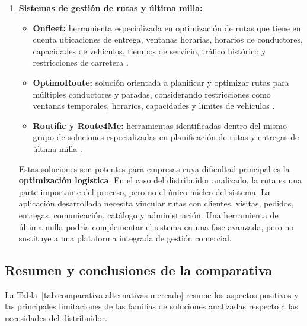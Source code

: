 \begin{enumerate}[label=\textbf{\arabic*.}, leftmargin=1.1cm, itemsep=0.6em, topsep=0.35em]
  \item \textbf{Sistemas de gestión de rutas y última milla:}
  \begin{itemize}[topsep=0.1em, itemsep=0.15em]
    \item \textbf{Onfleet:} herramienta especializada en optimización de rutas que tiene en cuenta ubicaciones de entrega, ventanas horarias, horarios de conductores, capacidades de vehículos, tiempos de servicio, tráfico histórico y restricciones de carretera \citep{onfleet-route-optimization}.
    \item \textbf{OptimoRoute:} solución orientada a planificar y optimizar rutas para múltiples conductores y paradas, considerando restricciones como ventanas temporales, horarios, capacidades y límites de vehículos \citep{optimoroute-features}.
    \item \textbf{Routific y Route4Me:} herramientas identificadas dentro del mismo grupo de soluciones especializadas en planificación de rutas y entregas de última milla \citep{routific-features,route4me-features}.
  \end{itemize}

  Estas soluciones son potentes para empresas cuya dificultad principal es la \textbf{optimización logística}. En el caso del distribuidor analizado, la ruta es una parte importante del proceso, pero no el único núcleo del sistema. La aplicación desarrollada necesita vincular rutas con clientes, visitas, pedidos, entregas, comunicación, catálogo y administración. Una herramienta de última milla podría complementar el sistema en una fase avanzada, pero no sustituye a una plataforma integrada de gestión comercial.
\end{enumerate}

\subsection{Resumen y conclusiones de la comparativa}

La Tabla~\ref{tab:comparativa-alternativas-mercado} resume los aspectos positivos y las principales limitaciones de las familias de soluciones analizadas respecto a las necesidades del distribuidor.

